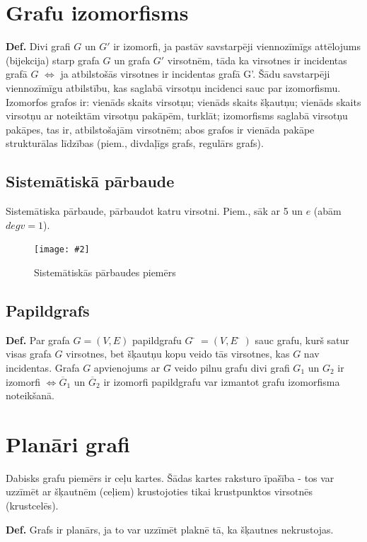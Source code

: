 \documentclass{article}
\newcommand{\illustration}[3]{
	\begin{figure}[H]
		\centering	
		\texttt{[image: \#2]}
		\caption{#3}
	\end{figure}
}
\begin{document}
\section{Grafu izomorfisms}

\textbf{Def.}  Divi grafi $G$ un $G'$ ir izomorfi, ja pastāv savstarpēji viennozīmīgs attēlojums (bijekcija) starp grafa $ G  $ un grafa $ G' $ virsotnēm, tāda ka virsotnes ir incidentas grafā $ G $ $\Leftrightarrow$ ja atbilstošās virsotnes ir incidentas grafā G'.  Šādu savstarpēji viennozīmīgu atbilstību, kas saglabā virsotņu incidenci sauc par izomorfismu.  
Izomorfos grafos ir: vienāds skaits virsotņu; vienāds skaits šķautņu; vienāds skaits virsotņu ar noteiktām virsotņu pakāpēm, turklāt; izomorfisms saglabā virsotņu pakāpes, tas ir, atbilstošajām virsotnēm; abos grafos ir vienāda pakāpe strukturālas līdzības (piem., divdaļīgs grafs, regulārs grafs).

\subsection{Sistemātiskā pārbaude}

Sistemātiska pārbaude, pārbaudot katru virsotni. Piem., sāk ar 5 un $e$ (abām $degv=1$).
\illustration{1}{isomorphism-1}{Sistemātiskās pārbaudes piemērs}

\subsection{Papildgrafs}

\textbf{Def.}  Par grafa $G=(V , E )$ papildgrafu $Ḡ = (V , Ē )$ sauc grafu, kurš satur visas grafa $G$ virsotnes, bet šķautņu kopu veido tās virsotnes, kas $G$ nav incidentas.  Grafa $G$ apvienojums ar $G$̄ veido pilnu grafu divi grafi $G_1$ un $G_2$ ir izomorfi $\Leftrightarrow \overline{G}_1 $ un $ \overline{G}_2$ ir izomorfi papildgrafu var izmantot grafu izomorfisma noteikšanā.

\section{Planāri grafi}
Dabisks grafu piemērs ir ceļu kartes. Šādas kartes raksturo īpašība - tos var uzzīmēt ar šķautnēm (ceļiem) krustojoties tikai krustpunktos virsotnēs (krustcelēs).

\textbf{Def.}  Grafs ir planārs, ja to var uzzīmēt plaknē tā, ka šķautnes nekrustojas. 
\end{document}
